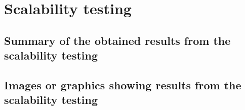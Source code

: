 \documentclass[a4paper,12pt]{article}
\makeatletter
\newif\ifshowinstructions
\newcommand{\instructions}[1]{\ifshowinstructions {\fontsize{10}{11}\selectfont \textit{#1}} \fi}
\newenvironment{jubox}
  {
    \begin{mdframed}
    \globalcolor{blue}
  }
  {
    \end{mdframed}
  }
\newcommand{\globalcolor}[1]{%
  \color{#1}\global\let\default@color\current@color
}
\makeatother
\begin{document}
\section{Scalability testing}

\subsection{Summary of the obtained results from the scalability testing}

\instructions{Please show the scaling behaviour of the application. Which progress was achieved? Does it fulfill the set expectations? If not, what were the reasons? (maximum 500 words)}

\begin{jubox}
\end{jubox}

\subsection{Images or graphics showing results from the scalability testing}

\instructions{All tables and figures (including photographs, schemas, graphs and diagrams) should be numbered with Arabic numerals (1, 2,\ldots n) and include a descriptive caption. Please attach the images to this form (minimum resolution 300 dpi).}
\end{document}
